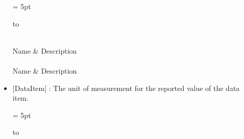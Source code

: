 \begin{itemize}
\tabulinesep = 5pt
\begin{longtabu} to \textwidth {
    |l|X|}
  \caption{DataItemTypeEnum Enumeration}
  \label{enum:DataItemTypeEnum} \\

\hline
Name & Description \\
\hline
\endfirsthead
\hline
{} \\
\hline
Name & Description \\
\hline
\endhead
\end{longtabu}

\FloatBarrier
\item {}[DataItem] : The unit of measurement for the reported value of the data item.

\tabulinesep = 5pt
\begin{longtabu} to \textwidth {
    |l|X|}
  \caption{UnitEnum Enumeration}
  \label{enum:UnitEnum} \\


\end{longtabu}
\end{itemize}
